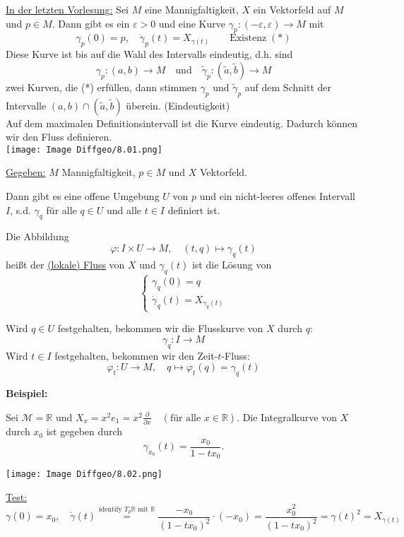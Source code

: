 \documentclass[fleqn, 12pt, letterpaper]{article}
\newcommand{\txt}[1]{\text{#1}}
\begin{document}
\underline{In der letzten Vorlesung:}
Sei $M$ eine Mannigfaltigkeit, $X$ ein Vektorfeld auf $M$ und $p \in M$. Dann gibt es ein $\varepsilon > 0$ und eine Kurve
\(
\gamma_p: (-\varepsilon, \varepsilon) \rightarrow M
\)
mit 
\[
\gamma_p(0) = p, \quad \dot{\gamma}_p(t) = X_{\gamma(t)}  \quad\quad \txt{Existenz} \;(*)
\]
Diese Kurve ist bis auf die Wahl des Intervalls eindeutig, d.h. sind 
\[
\gamma_p: (a, b) \rightarrow M \quad \text{und} \quad \tilde{\gamma}_p: (\tilde{a}, \tilde{b}) \rightarrow M
\]
zwei Kurven, die (*) erfüllen, dann stimmen $\gamma_p$ und $\tilde{\gamma}_p$ auf dem Schnitt der Intervalle $(a, b) \cap (\tilde{a}, \tilde{b})$ überein. (Eindeutigkeit)\\
Auf dem maximalen Definitionsintervall ist die Kurve eindeutig. Dadurch können wir den Fluss definieren.\\

\texttt{[image: Image Diffgeo/8.01.png]}

\underline{Gegeben:} $M$ Mannigfaltigkeit, $p \in M$ und $X$ Vektorfeld.

Dann gibt es eine offene Umgebung $U$ von $p$ und ein nicht-leeres offenes Intervall $I$, s.d. $\gamma_q$ 
für alle $q \in U$ und alle $t \in I$ definiert ist.

Die Abbildung 
\[
\varphi: I \times U \longrightarrow M, \quad (t, q) \longmapsto \gamma_q(t)
\]
heißt der \underline{(lokale) Fluss} von $X$ und $\gamma_q(t)$ ist die Lösung von
\[
\begin{cases} 
\gamma_q(0) = q \\ 
\dot{\gamma}_q(t) = X_{\gamma_q(t)}
\end{cases}
\]

Wird $q \in U$ festgehalten, bekommen wir die Flusskurve von $X$ durch $q$:
\[
\gamma_q: I \longrightarrow M
\]
Wird $t \in I$ festgehalten, bekommen wir den Zeit-$t$-Fluss:
\[
\varphi_t: U \longrightarrow M, \quad q \longmapsto \varphi_t(q) = \gamma_q(t)
\]

\textbf{Beispiel:}

Sei $\mathcal{M} = \mathbb{R}$ und $X_x = x^2 e_1 = x^2 \frac{\partial}{\partial x} \quad (\text{für alle } x \in \mathbb{R})$. Die Integralkurve von $X$ durch $x_0$ ist gegeben durch
\[
\gamma_{x_0}(t) = \frac{x_0}{1 - t x_0}.
\]

\texttt{[image: Image Diffgeo/8.02.png]}


\underline{Test:} 
\[
\gamma(0) = x_0, \quad \dot{\gamma}(t) \overset{\txt{identify $T_p\mathbb{R}$ mit $\mathbb{R}$}}{=} 
\frac{-x_0}{(1 - t x_0)^2} \cdot (-x_0) = \frac{x_0^2}{(1 - t x_0)^2} = \gamma(t)^2 = X_{\gamma(t)}
\]
\end{document}
